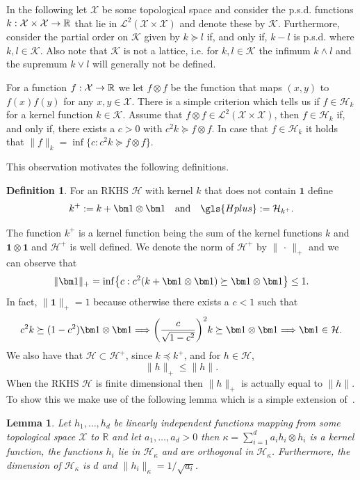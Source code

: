 \documentclass[10pt]{amsart}
\newtheorem{lemm}[theo]{Lemma}\newtheorem{prop}[theo]{Proposition}\newtheorem{coro}[theo]{Corollary}\newtheorem{conj}[theo]{Conjecture}
\theoremstyle{definition}\newtheorem{defi}[theo]{Definition}\newtheorem{rema}[theo]{Remark}\newtheorem{exam}[theo]{Example}\newtheorem{exem}[theo]{Example}\newtheorem{nota}[theo]{Notation}
\theoremstyle{remark}
\newcommand{\R}{\mathbb{R}}
\newcommand{\X}{\mathcal{X}}
\newcommand{\cH}{\mathcal{H}}
\newcommand{\clL}{\mathcal{L}}
\newcommand{\clK}{\mathcal{K}}
\renewcommand*{\to}{\mathchoice{\longrightarrow}{\rightarrow}{\rightarrow}{\rightarrow}}
\renewcommand*{\implies}{\mathchoice{\Longrightarrow}{\Rightarrow}{\Rightarrow}{\Rightarrow}}
\let\originalleft\left
\let\originalright\right
\renewcommand{\left}{\mathopen{}\mathclose\bgroup\originalleft}
\renewcommand{\right}{\aftergroup\egroup\originalright}
\begin{document}
In the following let $\X$ be some topological space and consider the p.s.d. functions $k:\X \times \X \to \R$ that lie in $\clL^2(\X \times \X)$ and denote these by $\clK$. Furthermore, consider the partial order on $\clK$ given by $k \succeq l$ if, and only if, $k - l$ is p.s.d. where $k,l \in \clK$. Also note that $\clK$ is not a lattice, i.e. for $k,l \in \clK$ the infimum $k\wedge l$ and the supremum $k \vee l$ will generally not be defined.

For a function $f: \X \to \R$ we let $f \otimes f$ be the function that maps $(x,y)$ to $f(x)f(y)$ for any $x, y \in \X$. There is a simple criterion which tells us if $f \in \cH_k$ for a kernel function $k \in \clK$. Assume that $f\otimes f \in \clL^2(\X \times \X)$, then $f\in \cH_k$ if, and only if, there exists a $c>0$ with $c^2 k \succeq f \otimes f$. In case that $f\in \cH_k$ it holds that $\|f\|_k = \inf \{c: c^2 k \succeq f \otimes f\}$.


This observation motivates the following definitions.
\begin{defi}
For an RKHS $\cH$ with kernel $k$ that does not contain $\bm 1$ define
\begin{equation}\label{def:k_plus}
k^+ := k + \bm 1\otimes \bm 1 \quad\text{and}\quad \gls{Hplus} := \cH_{k^+}.
\end{equation}
\end{defi}

The function $k^+$ is a kernel function being the sum of the kernel functions $k$ and $\bm 1 \otimes \bm 1$ and $\cH^+$ is well defined. We denote the norm of $\cH^+$ by $\|\,\cdot\, \|_+$ and we can observe that
\[
\| \bm 1\|_+ = \inf\left\{c : c^2 (k + \bm 1 \otimes \bm 1) \succeq \bm 1 \otimes \bm 1 \right\} \leq 1.
\]
In fact, $\|\bm 1\|_+ = 1$ because otherwise there exists a $c < 1$ such that
\[
c^2 k \succeq (1-c^2) \bm 1 \otimes \bm 1 \implies \left(\frac{c}{\sqrt{1-c^2}}\right)^2 k \succeq \bm 1 \otimes \bm 1 \implies \bm 1 \in \cH.
\]
We also have that $\cH \subset \cH^+$, since $k \preceq k^+$, and for $h\in \cH$,
\begin{equation}\label{eq:order_plus_leq}
\|h\|_+ \leq \|h\|.
\end{equation}
When the RKHS $\cH$ is finite dimensional then $\|h\|_+$ is actually equal to $\|h\|$. To show this we make use of the following lemma which is a simple extension of~\cite[Section~5.3]{PAUL16}.

\begin{lemm}\label{lem:order_orthogonal}
Let $h_1,\dots, h_d$ be linearly independent functions mapping from some topological space $\X$ to $\R$ and let $a_1,\dots, a_d >0$ then $\kappa = \sum_{i=1}^d a_i h_i \otimes h_i$ is a kernel function, the functions $h_i$ lie in $\cH_\kappa$ and are orthogonal in $\cH_\kappa$. Furthermore, the dimension of $\cH_\kappa$ is $d$ and $\|h_i\|_\kappa =1/ \sqrt{a_i}$.
\end{lemm}
\end{document}

